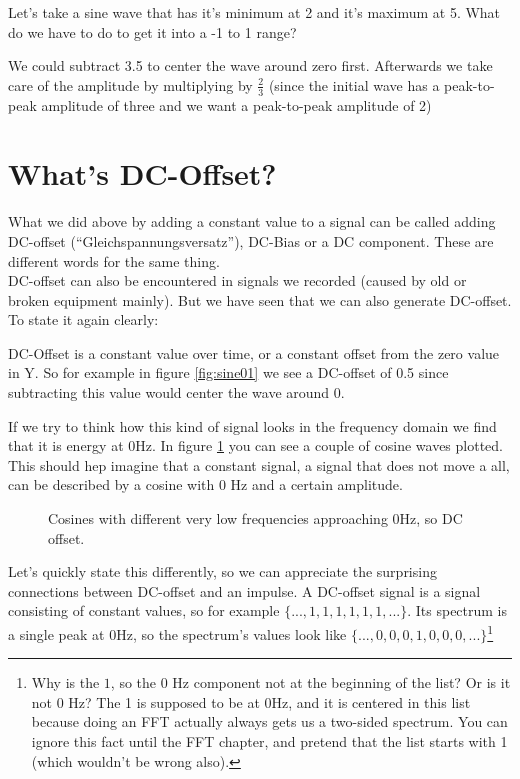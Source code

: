 \begin{question}
Let's take a sine wave that has it's minimum at 2 and it's maximum at 5. What do we have to do to get it into a -1 to 1 range?
\end{question}
\begin{Answer}
We could subtract 3.5 to center the wave around zero first. Afterwards we take care of the amplitude by multiplying by $\frac{2}{3}$ (since the initial wave has a peak-to-peak amplitude of three and we want a peak-to-peak amplitude of 2)
\end{Answer}



\section{What's DC-Offset?}

What we did above by adding a constant value to a signal can be called adding DC-offset (``Gleichspannungsversatz''), DC-Bias or a DC component. These are different words for the same thing.\\
DC-offset can also be encountered in signals we recorded (caused by old or broken equipment mainly). But we have seen that we can also generate DC-offset.\\
To state it again clearly:
\begin{framed}
DC-Offset is a constant value over time, or a constant offset from the zero value in Y. So for example in figure \ref{fig:sine01} we see a DC-offset of 0.5 since subtracting this value would center the wave around 0.
\end{framed}
If we try to think how this kind of signal looks in the frequency domain we find that it is energy at 0Hz. In figure \ref{fig:dcViz} you can see a couple of cosine waves plotted. This should hep imagine that a constant signal, a signal that does not move a all, can be described by a cosine with 0 Hz and a certain amplitude.

\begin{figure}[h!]
	\centering
	
	\caption[Cosines to DC]
	{Cosines with different very low frequencies approaching 0Hz, so DC offset.}
	\label{fig:dcViz}
\end{figure}

Let's quickly state this differently, so we can appreciate the surprising connections between DC-offset and an impulse. A DC-offset signal is a signal consisting of constant values, so for example $\{...,1,1,1,1,1,1,...\}$. Its spectrum is a single peak at 0Hz, so the spectrum's values look like $\{..., 0,0,0,1,0,0,0,...\}$\footnote{Why is the $1$, so the 0 Hz component not at the beginning of the list? Or is it not 0 Hz? The 1 is supposed to be at 0Hz, and it is centered in this list because doing an FFT actually always gets us a two-sided spectrum. You can ignore this fact until the FFT chapter, and pretend that the list starts with 1 (which wouldn't be wrong also). }


